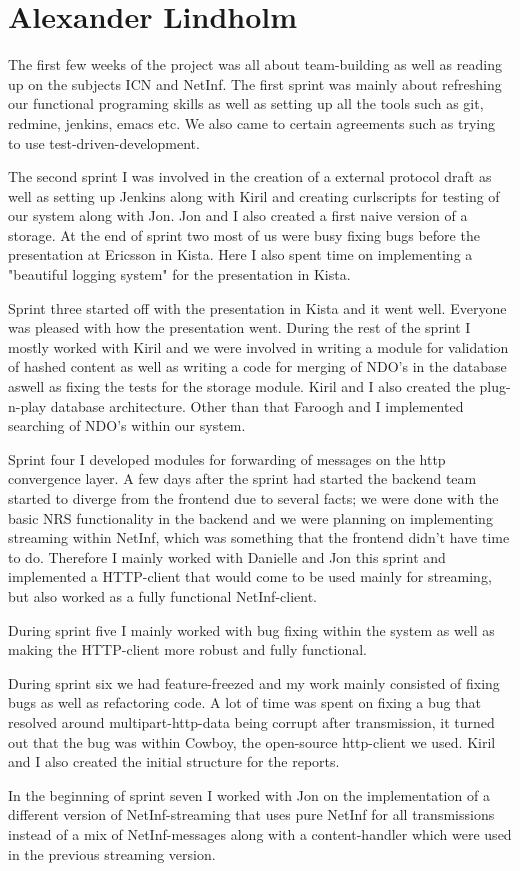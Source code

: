\section{Alexander Lindholm}
The first few weeks of the project was all about team-building as well as reading up on the subjects ICN and NetInf. The first sprint was mainly about refreshing our functional programing skills as well as setting up all the tools such as git, redmine, jenkins, emacs etc. We also came to certain agreements such as trying to use test-driven-development. 

The second sprint I was involved in the creation of a external protocol draft as well as setting up Jenkins along with Kiril and creating curlscripts for testing of our system along with Jon. Jon and I also created a first naive version of a storage. At the end of sprint two most of us were busy fixing bugs before the presentation at Ericsson in Kista. Here I also spent time on implementing a "beautiful logging system" for the presentation in Kista.

Sprint three started off with the presentation in Kista and it went well. Everyone was pleased with how the presentation went. During the rest of the sprint I mostly worked with Kiril and we were involved in writing a module for validation of hashed content as well as writing a code for merging of NDO's in the database aswell as fixing the tests for the storage module. Kiril and I also created the plug-n-play database architecture. Other than that Faroogh and I implemented searching of NDO's within our system.

Sprint four I developed modules for forwarding of messages on the http convergence layer.
A few days after the sprint had started the backend team started to diverge from the frontend due to several facts;
we were done with the basic NRS functionality in the backend and we were planning on implementing streaming within NetInf, which was something that the frontend didn't have time to do. 
Therefore I mainly worked with Danielle and Jon this sprint and implemented a HTTP-client that would come to be used mainly for streaming, but also worked as a fully functional NetInf-client. 

During sprint five I mainly worked with bug fixing within the system as well as making the HTTP-client more robust and fully functional.

During sprint six we had feature-freezed and my work mainly consisted of fixing bugs as well as refactoring code. A lot of time was spent on fixing a bug that resolved around multipart-http-data being corrupt after transmission, it turned out that the bug was within Cowboy, the open-source http-client we used. Kiril and I also created the initial structure for the reports. 

In the beginning of sprint seven I worked with Jon on the implementation of a different version of NetInf-streaming that uses pure NetInf for all transmissions instead of a mix of NetInf-messages along with a content-handler which were used in the previous streaming version. 


